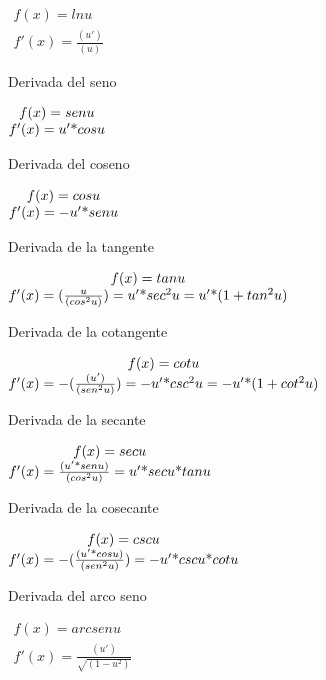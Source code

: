 \documentclass{article}
\newcommand\normalsubformula[1]{\text{\mathversion{normal}$#1$}}
\begin{document}
 $\begin{matrix}f(x)=lnu\\f'(x)=\frac{(u')}{(u)}\end{matrix}$

Derivada del seno

 $\begin{matrix}f(x)=senu\\f'(x)=u'\normalsubformula{\text{*}}cosu\end{matrix}$

Derivada del coseno

 $\begin{matrix}f(x)=cosu\\f'(x)=-u'\normalsubformula{\text{*}}senu\end{matrix}$

Derivada de la tangente

 $\begin{matrix}f(x)=tanu\\f'(x)=(\frac{u}{({cos}^{2}u)})=u'\normalsubformula{\text{*}}{sec}^{2}u=u'\normalsubformula{\text{*}}(1+{tan}^{2}u)\end{matrix}$

Derivada de la cotangente

 $\begin{matrix}f(x)=cotu\\f'(x)=-(\frac{(u')}{({sen}^{2}u)})=-u'\normalsubformula{\text{*}}{csc}^{2}u=-u'\normalsubformula{\text{*}}(1+{cot}^{2}u)\end{matrix}$

Derivada de la secante

 $\begin{matrix}f(x)=secu\\f'(x)=\frac{(u'\normalsubformula{\text{*}}senu)}{({cos}^{2}u)}=u'\normalsubformula{\text{*}}secu\normalsubformula{\text{*}}tanu\end{matrix}$

Derivada de la cosecante

 $\begin{matrix}f(x)=cscu\\f'(x)=-(\frac{(u'\normalsubformula{\text{*}}cosu)}{({sen}^{2}u)})=-u'\normalsubformula{\text{*}}cscu\normalsubformula{\text{*}}cotu\end{matrix}$

Derivada del arco seno

 $\begin{matrix}f(x)=arcsenu\\f'(x)=\frac{(u')}{\sqrt{(1-u^{2})}}\end{matrix}$
\end{document}
